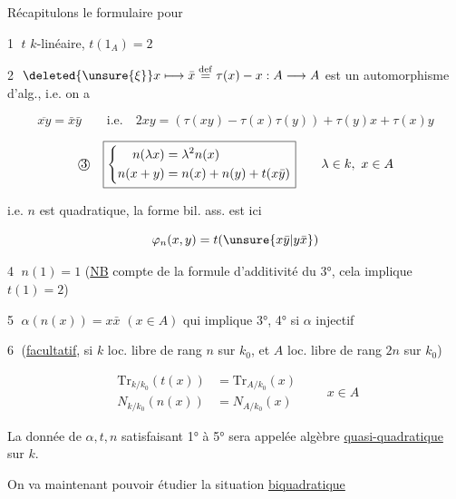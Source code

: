 
Récapitulons le formulaire pour



\textcircled{1} $t$  $k$-linéaire, $\boxed{t(1_A)=2}$

\textcircled{2} $\deleted{\unsure{\xi}}x\longmapsto\bar x\overset{\mathrm{def}}{=}\tau(x)-x:A\longrightarrow A$ est un automorphisme d'alg., i.e. on a


\[
\boxed{\overline{xy}=\bar x\bar y}\qquad\text{i.e.}\quad
2xy=(\tau(xy)-\tau(x)\tau(y))+\tau(y)x+\tau(x)y
\]

\[
\text{\textcircled{3}}\quad\boxed{\left\{\begin{aligned}
n(\lambda x)&=\lambda^2n(x)\\
n(x+y)&=n(x)+n(y)+t(x\bar y)
\end{aligned}\right.}\qquad\lambda\in k,\ x\in A
\]

i.e. $n$ est quadratique, la forme bil. ass. est ici

\[
\varphi_n(x,y)=t(\unsure{x\bar y|y\bar x})
\]

\textcircled{4} $\boxed{n(1)=1}$ (\uline{NB} compte  de la formule d'additivité du 3°, cela implique $t(1)=2$)

\textcircled{5} $\boxed{\alpha(n(x))=x\bar x}$ $(x\in A)$ qui implique 3°, 4° si $\alpha$ injectif

\textcircled{6} (\uline{facultatif}, \deleted{)} si $k$ loc. libre de rang $n$ sur $k_0$, et $A$ loc. libre de rang $2n$ sur $k_0$)

\[
\boxed{\begin{aligned}
\mathrm{Tr}_{k/k_0}(t(x))&=\mathrm{Tr}_{A/k_0}(x)\\
N_{k/k_0}(n(x))&=N_{A/k_0}(x)
\end{aligned}}\qquad x\in A
\]

La donnée de  $\alpha,t,n$ satisfaisant 1° à 5° sera appelée algèbre \uline{quasi-quadratique} sur $k$.

On va maintenant pouvoir étudier la situation \uline{biquadratique}


